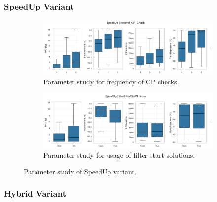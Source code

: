 \subsubsection{SpeedUp Variant}
\label{app:subsec:parameterstudy_SpeedUp}

\begin{figure}[!ht]
	\centering
	\begin{subfigure}[t]{\textwidth}
		\centering
		\includegraphics[width=\linewidth]{pictures/parameter_study/Interval_CP_Check_SpeedUp_parameter_study.png}
		\caption{Parameter study for frequency of CP checks.}
	\end{subfigure}
	\begin{subfigure}[t]{\textwidth}
		\centering
		\includegraphics[width=\linewidth]{pictures/parameter_study/UseFilterStartSolution_SpeedUp_parameter_study.png}
		\caption{Parameter study for usage of filter start solutions.}
	\end{subfigure}
	\caption{Parameter study of SpeedUp variant.}
\end{figure}

\clearpage
\subsubsection{Hybrid Variant}
\label{app:subsec:parameterstudy_Hybrid}

